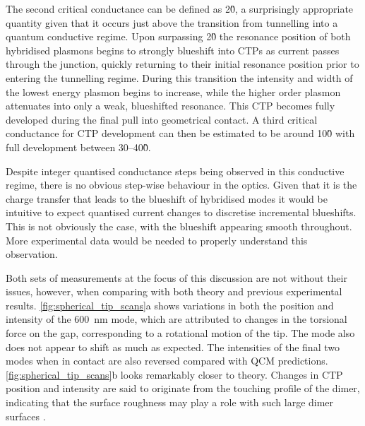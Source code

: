 \documentclass[a4paper, 11pt]{article}
\begin{document}
The second critical conductance can be defined as 2\G0, a surprisingly appropriate quantity given that it occurs just above the transition from tunnelling into a quantum conductive regime. Upon surpassing 2\G0 the resonance position of both hybridised plasmons begins to strongly blueshift into CTPs as current passes through the junction, quickly returning to their initial resonance position prior to entering the tunnelling regime. During this transition the intensity and width of the lowest energy plasmon begins to increase, while the higher order plasmon attenuates into only a weak, blueshifted resonance. This CTP becomes fully developed during the final pull into geometrical contact. A third critical conductance for CTP development can then be estimated to be around 10\G0 with full development between 30--40\G0.

Despite integer quantised conductance steps being observed in this conductive regime, there is no obvious step-wise behaviour in the optics. Given that it is the charge transfer that leads to the blueshift of hybridised modes it would be intuitive to expect quantised current changes to discretise incremental blueshifts. This is not obviously the case, with the blueshift appearing smooth throughout. More experimental data would be needed to properly understand this observation.

Both sets of measurements at the focus of this discussion are not without their issues, however, when comparing with both theory and previous experimental results. \autoref{fig:spherical_tip_scans}a shows variations in both the position and intensity of the \SI{600}{nm} mode, which are attributed to changes in the torsional force on the gap, corresponding to a rotational motion of the tip. The mode also does not appear to shift as much as expected. The intensities of the final two modes when in contact are also reversed compared with QCM predictions. \autoref{fig:spherical_tip_scans}b looks remarkably closer to theory. Changes in CTP position and intensity are said to originate from the touching profile of the dimer, indicating that the surface roughness may play a role with such large dimer surfaces \cite{zuloaga2009, barbry2015}.
\end{document}
